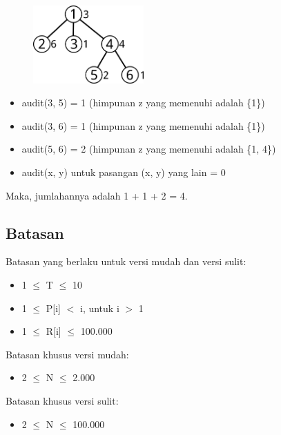 \documentclass[../main_problemset.tex]{subfiles} %
\begin{document}
\begin{figure}[H]
	\centering
	\includegraphics[width=160px]{richer/asset/1}
\end{figure}

\begin{itemize}
	\item audit(3, 5) = 1 (himpunan z yang memenuhi adalah \{1\})
	\item audit(3, 6) = 1 (himpunan z yang memenuhi adalah \{1\})
	\item audit(5, 6) = 2 (himpunan z yang memenuhi adalah \{1, 4\})
	\item audit(x, y) untuk pasangan (x, y) yang lain = 0
\end{itemize}

Maka, jumlahannya adalah 1 + 1 + 2 = 4.

\subsection*{Batasan}

\begin{minipage}[t]{0.47\textwidth}

Batasan yang berlaku untuk versi mudah dan versi sulit:

\begin{itemize}
	\item 1 $ \leq $ T $ \leq $ 10
	\item 1 $ \leq $ P[i] $ < $ i, untuk i $ > $ 1
	\item 1 $ \le $ R[i] $ \le $ 100.000
\end{itemize}
\end{minipage}
\begin{minipage}[t]{0.06\textwidth}
	\hfill
\end{minipage}
\begin{minipage}[t]{0.47\textwidth}
Batasan khusus versi mudah:
\begin{itemize}
	\item 2 $ \le $ N $ \le $ 2.000
\end{itemize}

\vspace{.2cm}

Batasan khusus versi sulit:
\begin{itemize}
	\item 2 $ \le $ N $ \le $ 100.000
\end{itemize}
\end{minipage}
\end{document}

